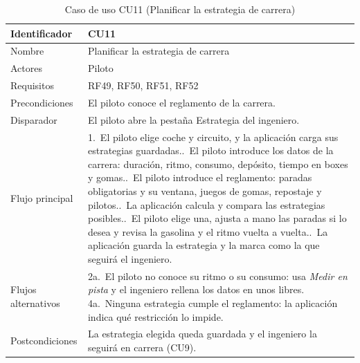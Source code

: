 \clearpage   %
\begin{table}[H]
	\centering
	\renewcommand{\arraystretch}{1.5}
	\begin{tabular}{|l|p{10cm}|}
		\hline
		Identificador & CU11 \\
		\hline
		Nombre & Planificar la estrategia de carrera \\
		\hline
		Actores & Piloto \\
		\hline
		Requisitos & RF49, RF50, RF51, RF52 \\
		\hline
		Precondiciones & El piloto conoce el reglamento de la carrera. \\
		\hline
		Disparador & El piloto abre la pestaña Estrategia del ingeniero. \\
		\hline
		Flujo principal & 1.~El piloto elige coche y circuito, y la aplicación carga sus estrategias guardadas.\newline
		2.~El piloto introduce los datos de la carrera: duración, ritmo, consumo, depósito, tiempo en boxes y gomas.\newline
		3.~El piloto introduce el reglamento: paradas obligatorias y su ventana, juegos de gomas, repostaje y pilotos.\newline
		4.~La aplicación calcula y compara las estrategias posibles.\newline
		5.~El piloto elige una, ajusta a mano las paradas si lo desea y revisa la gasolina y el ritmo vuelta a vuelta.\newline
		6.~La aplicación guarda la estrategia y la marca como la que seguirá el ingeniero. \\
		\hline
		Flujos alternativos & 2a.~El piloto no conoce su ritmo o su consumo: usa \emph{Medir en pista} y el ingeniero rellena los datos en unos libres.\newline
		4a.~Ninguna estrategia cumple el reglamento: la aplicación indica qué restricción lo impide. \\
		\hline
		Postcondiciones & La estrategia elegida queda guardada y el ingeniero la seguirá en carrera (CU9). \\
		\hline
	\end{tabular}
	\caption{Caso de uso CU11 (Planificar la estrategia de carrera)}
	\label{tab:cu11}
\end{table}

